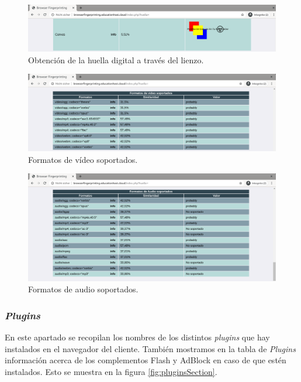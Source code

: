 \begin{figure}[tbp]
	\centering
	\includegraphics[width=1\textwidth]{Images/canvas.png}
	\caption{Obtención de la huella digital a través del lienzo.}
	\label{fig:canvas.png}
\end{figure}

\begin{figure}[tbp]
	\centering
	\includegraphics[width=1\textwidth]{Images/videosSection.png}
	\caption{Formatos de vídeo soportados.}
	\label{fig:videosSection}
\end{figure}



\begin{figure}[tbp]
	\centering
	\includegraphics[width=1\textwidth]{Images/audiosSection.png}
	\caption{Formatos de audio soportados.}
	\label{fig:audiosSection}
\end{figure}

\subsubsection{\textit{Plugins}}
En este apartado se recopilan los nombres de los distintos \textit{plugins} que hay instalados en el navegador del cliente. También mostramos en la tabla de \textit{Plugins} información acerca de los complementos Flash y AdBlock en caso de que estén instalados. Esto se muestra en la figura \ref{fig:pluginsSection}.

